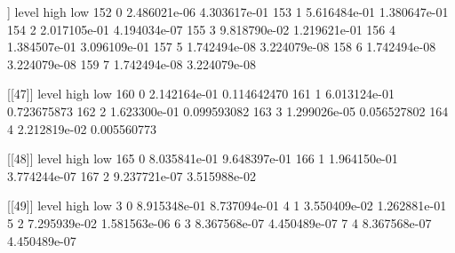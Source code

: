 \documentclass[letterpaper,10pt]{amsart}
\newenvironment{verbatimcode}{\bigskip \scriptsize \verbatim}{\endverbatim \normalsize \bigskip}
\begin{document}
\begin{enumerate}[(1)]
\begin{verbatimcode}
[[46]]
    level         high          low
152     0 2.486021e-06 4.303617e-01
153     1 5.616484e-01 1.380647e-01
154     2 2.017105e-01 4.194034e-07
155     3 9.818790e-02 1.219621e-01
156     4 1.384507e-01 3.096109e-01
157     5 1.742494e-08 3.224079e-08
158     6 1.742494e-08 3.224079e-08
159     7 1.742494e-08 3.224079e-08

[[47]]
    level         high         low
160     0 2.142164e-01 0.114642470
161     1 6.013124e-01 0.723675873
162     2 1.623300e-01 0.099593082
163     3 1.299026e-05 0.056527802
164     4 2.212819e-02 0.005560773

[[48]]
    level         high          low
165     0 8.035841e-01 9.648397e-01
166     1 1.964150e-01 3.774244e-07
167     2 9.237721e-07 3.515988e-02

[[49]]
  level         high          low
3     0 8.915348e-01 8.737094e-01
4     1 3.550409e-02 1.262881e-01
5     2 7.295939e-02 1.581563e-06
6     3 8.367568e-07 4.450489e-07
7     4 8.367568e-07 4.450489e-07
\end{verbatimcode}






\end{enumerate}
\end{document}
